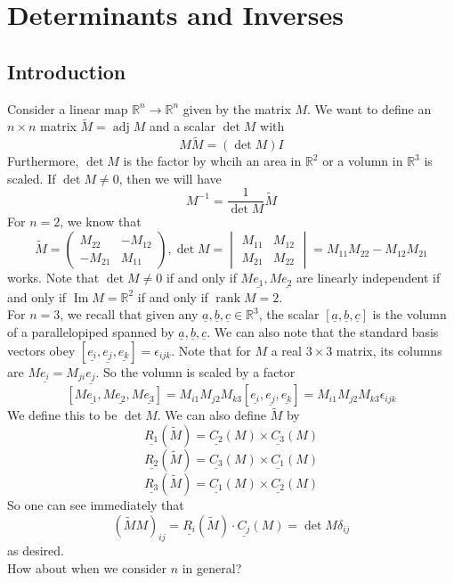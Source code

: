 \section{Determinants and Inverses}
\subsection{Introduction}
Consider a linear map $\mathbb R^n\to\mathbb R^n$ given by the matrix $M$.
We want to define an $n\times n$ matrix $\tilde{M}=\operatorname{adj}M$ and a scalar $\det M$ with
$$M\tilde{M}=(\det M)I$$
Furthermore, $\det M$ is the factor by whcih an area in $\mathbb R^2$ or a volumn in $\mathbb R^3$ is scaled.
If $\det M\neq 0$, then  we will have
$$M^{-1}=\frac{1}{\det M}\tilde{M}$$
For $n=2$, we know that
$$\tilde{M}=
\begin{pmatrix}
    M_{22}&-M_{12}\\
    -M_{21}&M_{11}
\end{pmatrix},
\det M=
\begin{vmatrix}
    M_{11}&M_{12}\\
    M_{21}&M_{22}
\end{vmatrix}
=M_{11}M_{22}-M_{12}M_{21}
$$
works.
Note that $\det M\neq 0$ if and only if $M\underline{e_1},M\underline{e_2}$ are linearly independent if and only if $\operatorname{Im}M=\mathbb R^2$ if and only if $\operatorname{rank}M=2$.\\
For $n=3$, we recall that given any $\underline{a},\underline{b},\underline{c}\in\mathbb R^3$, the scalar $[\underline{a},\underline{b},\underline{c}]$ is the volumn of a parallelopiped spanned by $\underline{a},\underline{b},\underline{c}$.
We can also note that the standard basis vectors obey $[\underline{e_i},\underline{e_j},\underline{e_k}]=\epsilon_{ijk}$.
Note that for $M$ a real $3\times 3$ matrix, its columns are $M\underline{e_i}=M_{ji}\underline{e_j}$.
So the volumn is scaled by a factor
$$[M\underline{e_1},M\underline{e_2},M\underline{e_3}]=M_{i1}M_{j2}M_{k3}[\underline{e_i},\underline{e_j},\underline{e_k}]=M_{i1}M_{j2}M_{k3}\epsilon_{ijk}$$
We define this to be $\det M$.
We can also define $\tilde{M}$ by
$$\underline{R_1}(\tilde{M})=\underline{C_2}(M)\times\underline{C_3}(M)$$
$$\underline{R_2}(\tilde{M})=\underline{C_3}(M)\times\underline{C_1}(M)$$
$$\underline{R_3}(\tilde{M})=\underline{C_1}(M)\times\underline{C_2}(M)$$
So one can see immediately that
$$(\tilde{M}M)_{ij}=\underline{R_i}(\tilde{M})\cdot\underline{C_j}(M)=\det M\delta_{ij}$$
as desired.\\
How about when we consider $n$ in general?
